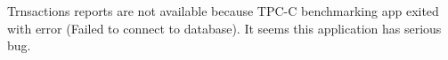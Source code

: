 \documentclass[../../main.tex]{subfiles}
\begin{document}
    Trnsactions reports are not available because TPC-C benchmarking app exited with error (Failed to connect to database). It seems this application has serious bug.
\end{document}
